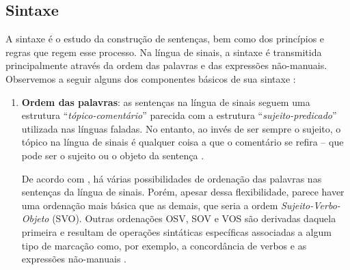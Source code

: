 \subsection{Sintaxe}
\label{sec:linguistica-sintaxe}

A sintaxe é o estudo da construção de sentenças, bem como dos princípios e regras que regem esse processo. Na língua de sinais, a sintaxe é transmitida principalmente através da ordem das palavras e das expressões não-manuais.
Observemos a seguir alguns dos componentes básicos de sua sintaxe \cite{jay-2011-dont-just-sign,hill-2019-sign-languages,quadros-2004-estudos-linguisticos}:

\begin{enumerate}
    \item \textbf{Ordem das palavras}: as sentenças na língua de sinais seguem uma estrutura ``\textit{tópico-comentário}'' parecida com a estrutura ``\textit{sujeito-predicado}'' utilizada nas línguas faladas. No entanto, ao invés de ser sempre o sujeito, o tópico na língua de sinais é qualquer coisa a que o comentário se refira -- que pode ser o sujeito ou o objeto da sentença \cite{jay-2011-dont-just-sign}. 
    
    De acordo com , há várias possibilidades de ordenação das palavras nas sentenças da língua de sinais. Porém, apesar dessa flexibilidade, parece haver uma ordenação mais básica que as demais, que seria a ordem \textit{Sujeito-Verbo-Objeto} (SVO). 
    Outras ordenações OSV, SOV e VOS são derivadas daquela primeira e resultam de operações sintáticas específicas  associadas a algum tipo de marcação como, por exemplo, a concordância de verbos e as expressões não-manuais \cite{quadros-2004-estudos-linguisticos}. 
    
    




\end{enumerate}
